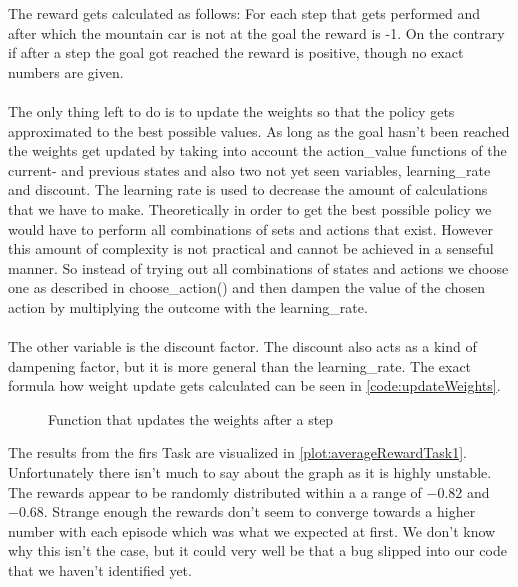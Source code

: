 \documentclass{article}
\begin{document}
	The reward gets calculated as follows: For each step that gets performed and after which the mountain car is not at the goal the reward is -1. On the contrary if after a step the goal got reached the reward is positive, though no exact numbers are given. \\
	\\
	The only thing left to do is to update the weights so that the policy gets approximated to the best possible values. As long as the goal hasn't been reached the weights get updated by taking into account the action\_value functions of the current- and previous states and also two not yet seen variables, learning\_rate and discount. The learning rate is used to decrease the amount of calculations that we have to make. Theoretically in order to get the best possible policy we would have to perform all combinations of sets and actions that exist. However this amount of complexity is not practical and cannot be achieved in a senseful manner. So instead of trying out all combinations of states and actions we choose one as described in choose\_action() and then dampen the value of the chosen action by multiplying the outcome with the learning\_rate. \\
	\\
	The other variable is the discount factor. The discount also acts as a kind of dampening factor, but it is more general than the learning\_rate. The exact formula how weight update gets calculated can be seen in \autoref{code:updateWeights}. 
	
	\begin{figure}[h]
		\caption{Function that updates the weights after a step}
		\label{code:updateWeights}
		
	\end{figure}
	
	\noindent The results from the firs Task are visualized in \autoref{plot:averageRewardTask1}. Unfortunately there isn't much to say about the graph as it is highly unstable. The rewards appear to be randomly distributed within a a range of $-0.82$ and $-0.68$. Strange enough the rewards don't seem to converge towards a higher number with each episode which was what we expected at first. We don't know why this isn't the case, but it could very well be that a bug slipped into our code that we haven't identified yet. 
	
\end{document}
